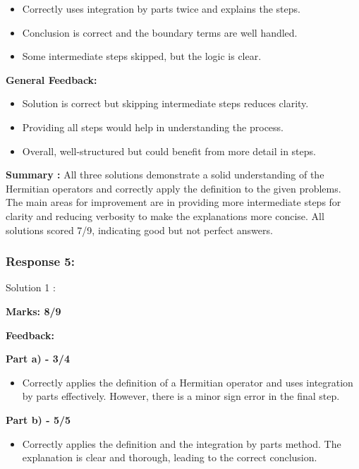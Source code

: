 \documentclass[a4paper,11pt]{article}
\begin{document}
\begin{itemize}
    \item Correctly uses integration by parts twice and explains the steps.
    \item Conclusion is correct and the boundary terms are well handled.
    \item Some intermediate steps skipped, but the logic is clear.
\end{itemize}

\textbf{General Feedback:}

\begin{itemize}
    \item Solution is correct but skipping intermediate steps reduces clarity.
    \item Providing all steps would help in understanding the process.
    \item Overall, well-structured but could benefit from more detail in steps.
\end{itemize}

\textbf{Summary :}
All three solutions demonstrate a solid understanding of the Hermitian operators and correctly apply the definition to the given problems. The main areas for improvement are in providing more intermediate steps for clarity and reducing verbosity to make the explanations more concise. All solutions scored 7/9, indicating good but not perfect answers.



\subsubsection*{Response 5:}

Solution 1 :

\textbf{Marks: 8/9}

\textbf{Feedback:}

\textbf{Part a) - 3/4}

\begin{itemize}
    \item Correctly applies the definition of a Hermitian operator and uses integration by parts effectively. However, there is a minor sign error in the final step.
\end{itemize}

\textbf{Part b) - 5/5}

\begin{itemize}
    \item Correctly applies the definition and the integration by parts method. The explanation is clear and thorough, leading to the correct conclusion.
\end{itemize}
\end{document}
